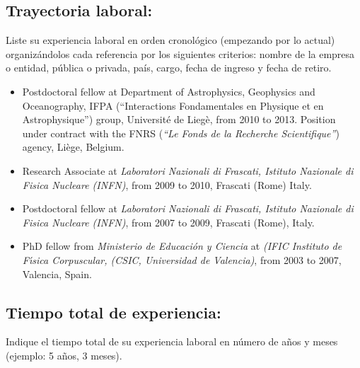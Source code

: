 \subsection{Trayectoria laboral:}
\begin{instrucciones}
  Liste su experiencia laboral en orden cronológico (empezando por lo
  actual) organizándolos cada referencia por los siguientes criterios:
  nombre de la empresa o entidad, pública o privada, país, cargo,
  fecha de ingreso y fecha de retiro.
\end{instrucciones}
\begin{itemize}
\item Postdoctoral fellow at Department of Astrophysics, Geophysics
  and Oceanography, IFPA (``Interactions Fondamentales en Physique et
  en Astrophysique'') group, Universit\'e de Lieg\`e, from 2010 to
  2013. Position under contract with the FNRS ({\it ``Le Fonds de la
    Recherche Scientifique''}) agency, Liège, Belgium.
\item Research Associate at {\it Laboratori Nazionali di
    Frascati, Istituto Nazionale di Fisica Nucleare (INFN)}, from
  2009 to 2010, Frascati (Rome) Italy.
\item Postdoctoral fellow at {\it Laboratori Nazionali di Frascati,
    Istituto Nazionale di Fisica Nucleare (INFN)}, from 2007 to 2009,
  Frascati (Rome), Italy.
\item PhD fellow from {{\it Ministerio de Educaci\'on y Ciencia}} at
  {\it (IFIC Instituto de F\'{\i}sica Corpuscular, (CSIC, Universidad
    de Valencia)}, from 2003 to 2007, Valencia, Spain.
\end{itemize}
\subsection{Tiempo total de experiencia:}
\begin{instrucciones}
  Indique el tiempo total de su experiencia laboral en número de años
  y meses (ejemplo: 5 años, 3 meses).
\end{instrucciones}


